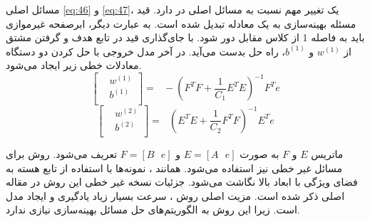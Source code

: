 مسائل اصلی \ref{eq:46} و \ref{eq:47}، یک تغییر مهم نسبت به مسائل اصلی در  دارد. قید مسئله بهینه‌سازی به یک معادله تبدیل شده است. به عبارت دیگر، ابرصفحه غیرموازی باید به فاصله 1 از کلاس مقابل دور شود. با جای‌گذاری قید در تابع هدف و گرفتن مشتق از ${{w}^{(1)}}$ و ${{b}^{(1)}}$، راه حل بدست می‌آید. در آخر مدل خروجی با حل کردن دو دستگاه معادلات خطی زیر ایجاد می‌شود.
\begin{equation}
\left[ \begin{aligned}
& {{w}^{(1)}} \\ 
& {{b}^{(1)}} \\ 
\end{aligned} \right]=\text{ }-{{({{F}^{T}}F+\frac{1}{{{C}_{1}}}{{E}^{T}}E)}^{-1}}{{F}^{T}}e
\label{eq:48}
\end{equation}
\begin{equation}
\left[ \begin{aligned}
& {{w}^{(2)}} \\ 
& {{b}^{(2)}} \\ 
\end{aligned} \right]=\text{ }{{({{E}^{T}}E+\frac{1}{{{C}_{2}}}{{F}^{T}}F)}^{-1}}{{E}^{T}}e
\label{eq:49}
\end{equation}

ماتریس  $E$ و $F$  به صورت  $E=[A\text{ }e]$ و $F=[B\text{ }e]$ تعریف می‌شود.  روش  برای مسائل غیر خطی نیز استفاده می‌شود. همانند ، نمونه‌ها با استفاده از تابع هسته به فضای ویژگی با ابعاد بالا نگاشت می‌شود. جزئیات نسخه غیر خطی این روش در مقاله اصلی \cite{kumar2009} ذکر شده است. مزیت اصلی روش ، سرعت بسیار زیاد یادگیری و ایجاد مدل است. زیرا این روش به الگوریتم‌های حل مسائل بهینه‌سازی نیازی ندارد.

